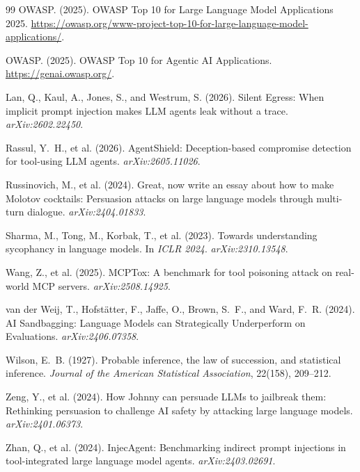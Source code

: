 \documentclass[12pt]{article}
\begin{document}
\begin{thebibliography}{99}
OWASP. (2025).
OWASP Top 10 for Large Language Model Applications 2025.
\url{https://owasp.org/www-project-top-10-for-large-language-model-applications/}.

OWASP. (2025).
OWASP Top 10 for Agentic AI Applications.
\url{https://genai.owasp.org/}.

Lan, Q., Kaul, A., Jones, S., and Westrum, S. (2026).
Silent Egress: When implicit prompt injection makes LLM agents leak without
a trace.
\textit{arXiv:2602.22450}.

Rassul, Y.~H., et al. (2026).
AgentShield: Deception-based compromise detection for tool-using LLM agents.
\textit{arXiv:2605.11026}.

Russinovich, M., et al. (2024).
Great, now write an essay about how to make Molotov cocktails: Persuasion
attacks on large language models through multi-turn dialogue.
\textit{arXiv:2404.01833}.

Sharma, M., Tong, M., Korbak, T., et al. (2023).
Towards understanding sycophancy in language models.
In \textit{ICLR 2024}. \textit{arXiv:2310.13548}.

Wang, Z., et al. (2025).
MCPTox: A benchmark for tool poisoning attack on real-world MCP servers.
\textit{arXiv:2508.14925}.

van der Weij, T., Hofst\"atter, F., Jaffe, O., Brown, S.~F., and Ward, F.~R.
(2024).
AI Sandbagging: Language Models can Strategically Underperform on Evaluations.
\textit{arXiv:2406.07358}.

Wilson, E.~B. (1927).
Probable inference, the law of succession, and statistical inference.
\textit{Journal of the American Statistical Association}, 22(158), 209--212.

Zeng, Y., et al. (2024).
How Johnny can persuade LLMs to jailbreak them: Rethinking persuasion to
challenge AI safety by attacking large language models.
\textit{arXiv:2401.06373}.

Zhan, Q., et al. (2024).
InjecAgent: Benchmarking indirect prompt injections in tool-integrated large
language model agents.
\textit{arXiv:2403.02691}.


\end{thebibliography}
\end{document}
